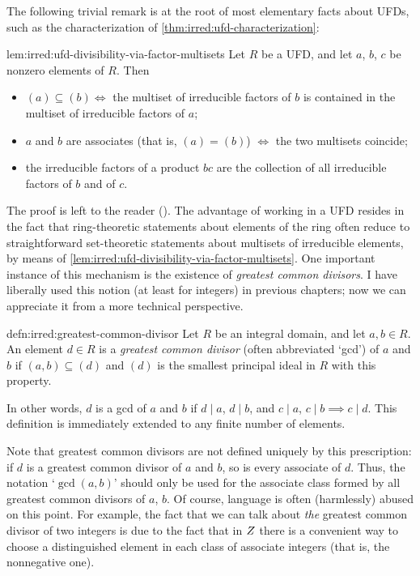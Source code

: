 The following trivial remark is at the root of most elementary facts
about UFDs, such as the characterization of \cref{thm:irred:ufd-characterization}:

\begin{lem}{}{lem:irred:ufd-divisibility-via-factor-multisets}
  Let $R$ be a UFD, and let $a$, $b$, $c$ be nonzero elements of
  $R$. Then
  \begin{itemize}
  \item $(a) \subseteq (b) \iff$ the multiset of irreducible factors
    of $b$ is contained in the multiset of irreducible factors of $a$;
  \item $a$ and $b$ are associates (that is, $(a) = (b)$) $\iff$ the
    two multisets coincide;
  \item the irreducible factors of a product $bc$ are the collection
    of all irreducible factors of $b$ and of $c$.
  \end{itemize}
\end{lem}

The proof is left to the reader
(). The
advantage of working in a UFD resides in the fact that ring-theoretic
statements about elements of the ring often reduce to straightforward
set-theoretic statements about multisets of irreducible elements, by
means of \cref{lem:irred:ufd-divisibility-via-factor-multisets}.  One important instance of this
mechanism is the existence of \emph{greatest common divisors}. I have
liberally used this notion (at least for integers) in previous
chapters; now we can appreciate it from a more technical perspective.

\begin{defn}{}{defn:irred:greatest-common-divisor}
  Let $R$ be an integral domain, and let $a, b \in R$. An element
  $d \in R$ is a \emph{greatest common divisor} (often abbreviated
  `gcd') of $a$ and $b$ if $(a, b) \subseteq (d)$ and $(d)$ is the
  smallest principal ideal in $R$ with this property.
\end{defn}

In other words, $d$ is a gcd of $a$ and $b$ if $d \mid a$, $d \mid b$,
and $c \mid a$, $c \mid b \implies c \mid d$. This definition is
immediately extended to any finite number of elements.

Note that greatest common divisors are not defined uniquely by this
prescription: if $d$ is a greatest common divisor of $a$ and $b$, so
is every associate of $d$. Thus, the notation `$\gcd(a, b)$' should
only be used for the associate class formed by all greatest common
divisors of $a$, $b$. Of course, language is often (harmlessly) abused
on this point.  For example, the fact that we can talk about
\emph{the} greatest common divisor of two integers is due to the fact
that in $Z$ there is a convenient way to choose a distinguished
element in each class of associate integers (that is, the nonnegative
one).

